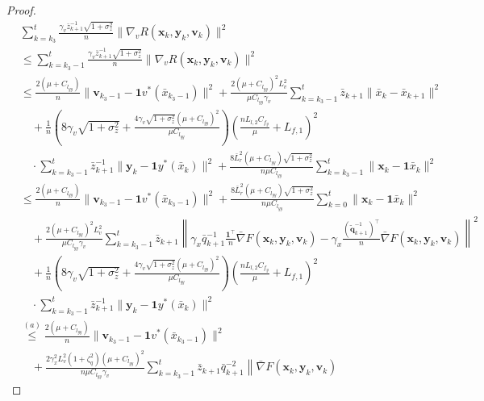 \documentclass{article}
\theoremstyle{plain}
\theoremstyle{definition}
\theoremstyle{remark}
\begin{document}
\begin{proof}
\begin{align}
&\sum_{k=k_3}^t \frac{\gamma_v\bar{z}_{k+1}^{-1}\sqrt{1+\sigma_z^2}}{n} \|\nabla_v R(\mathbf{x}_k, \mathbf{y}_k, \mathbf{v}_k)\|^2 \nonumber\\
&\leq \sum_{k=k_3-1}^t \frac{\gamma_v\bar{z}_{k+1}^{-1}\sqrt{1+\sigma_z^2}}{n} \|\nabla_v R(\mathbf{x}_k, \mathbf{y}_k, \mathbf{v}_k)\|^2\nonumber \\
&\leq \frac{2(\mu + C_{l_{yy}})}{n}\|\mathbf{v}_{k_3-1} - \mathbf{1}v^*(\bar{x}_{k_3-1})\|^2 + \frac{2(\mu + C_{l_{yy}})^2L_v^2}{\mu C_{l_{yy}}\gamma_v}  \sum_{k=k_3-1}^t \bar{z}_{k+1}\|\bar{x}_k - \bar{x}_{k+1}\|^2\nonumber\\
&\quad + \frac{1}{n}\left(8\gamma_v\sqrt{1+\sigma_z^2}+\frac{4\gamma_v\sqrt{1+\sigma_z^2}(\mu + C_{l_{yy}})^2}{\mu C_{l_{yy}}} \right)\left(\frac{nL_{l,2}C_{f_y}}{\mu}+L_{f,1}\right)^2 \nonumber\\
&\quad\cdot\sum_{k=k_3-1}^t\bar{z}_{k+1}^{-1}\|\mathbf{y}_k - \mathbf{1}y^*(\bar{x}_k)\|^2 +\frac{8\bar{L}_r^2(\mu + C_{l_{yy}})\sqrt{1+\sigma_z^2}}{n\mu C_{l_{yy}}} \sum_{k=k_3-1}^t\|\mathbf{x}_k-\mathbf{1}\bar{x}_k\|^2 \nonumber\\
&\leq  \frac{2(\mu + C_{l_{yy}})}{n}\|\mathbf{v}_{k_3-1} - \mathbf{1}v^*(\bar{x}_{k_3-1})\|^2+\frac{8\bar{L}_r^2(\mu + C_{l_{yy}})\sqrt{1+\sigma_z^2}}{n\mu C_{l_{yy}}} \sum_{k=0}^t\|\mathbf{x}_k-\mathbf{1}\bar{x}_k\|^2 \nonumber\\
&\quad+ \frac{2(\mu + C_{l_{yy}})^2L_v^2}{\mu C_{l_{yy}}\gamma_v}  \sum_{k=k_3-1}^t \bar{z}_{k+1} \left\| 
\gamma_x \bar{q}_{k+1}^{-1} \frac{\mathbf{1}^\top}{n} \bar{\nabla} F(\mathbf{x}_k,\mathbf{y}_k,\mathbf{v}_k) 
- \gamma_x \frac{\left(\tilde{\mathbf{q}}_{k+1}^{-1}\right)^\top}{n} \bar{\nabla} F(\mathbf{x}_k,\mathbf{y}_k,\mathbf{v}_k)
\right\|^2 \nonumber \\
&\quad +\frac{1}{n}\left(8\gamma_v\sqrt{1+\sigma_z^2}+\frac{4\gamma_v\sqrt{1+\sigma_z^2}(\mu + C_{l_{yy}})^2}{\mu C_{l_{yy}}} \right)\left(\frac{nL_{l,2}C_{f_y}}{\mu}+L_{f,1}\right)^2\nonumber\\
&\quad\cdot\sum_{k=k_3-1}^t\bar{z}_{k+1}^{-1}\|\mathbf{y}_k - \mathbf{1}y^*(\bar{x}_k)\|^2 \nonumber \\
&\overset{(a)}{\leq} \frac{2(\mu + C_{l_{yy}})}{n}\|\mathbf{v}_{k_3-1} - \mathbf{1}v^*(\bar{x}_{k_3-1})\|^2 \nonumber\\
&\quad+ \frac{2\gamma_x^2L_v^2(1+\zeta_q^2)(\mu + C_{l_{yy}})^2}{n\mu C_{l_{yy}}\gamma_v}  \sum_{k=k_3-1}^t \bar{z}_{k+1}\bar{q}_{k+1}^{-2} \left\| \bar{\nabla} F(\mathbf{x}_k,\mathbf{y}_k,\mathbf{v}_k)

\end{align}
\end{proof}
\end{document}
